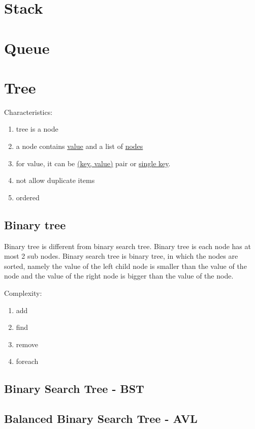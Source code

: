 \documentclass[12pt, a4paper]{report}
\begin{document}
    \section{Stack}
    
    \section{Queue}
    
    \section{Tree}
    Characteristics: 
    \begin{enumerate}
        \item tree is a node
        \item a node contains \underline{value} and a list of \underline{nodes}
        \item for value, it can be \underline{(key, value)} pair or \underline{single key}.
        \item not allow duplicate items
        \item ordered 
    \end{enumerate}
        \subsection{Binary tree}
        Binary tree is different from binary search tree. Binary tree is each node has at most 2 sub nodes. Binary search tree is binary tree, in which the nodes are sorted, namely the value of the left child node is smaller than the value of the node and the value of the right node is bigger than the value of the node.  \par 
        Complexity: 
        \begin{enumerate}
            \item add
            \item find
            \item remove
            \item foreach
        \end{enumerate}
        \subsection{Binary Search Tree - BST}
        \subsection{Balanced Binary Search Tree - AVL}
\end{document}
